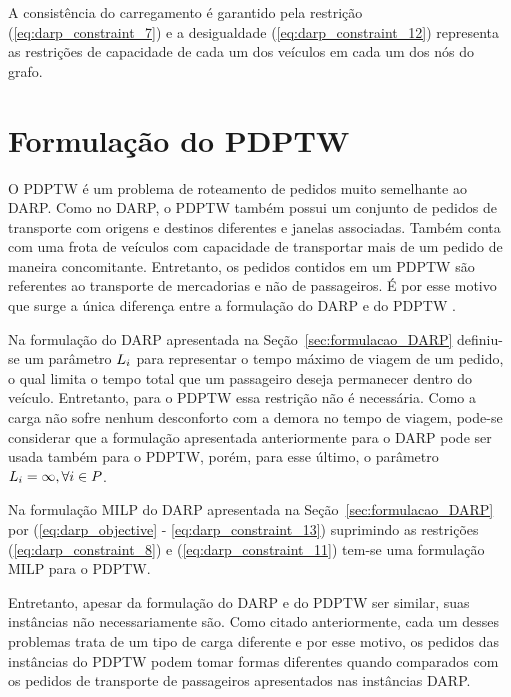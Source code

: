 A consistência do carregamento é garantido pela restrição 
(\ref{eq:darp_constraint_7}) e a desigualdade (\ref{eq:darp_constraint_12})
representa as restrições de capacidade de cada um dos veículos em cada um dos
nós do grafo.





\section{Formulação do PDPTW}\label{sec:formulacao_PDPTW}

O PDPTW é um problema de roteamento de pedidos muito semelhante ao DARP.
Como no DARP, o PDPTW também possui um conjunto de pedidos de transporte com
origens e destinos diferentes e janelas associadas.
Também conta com uma frota de veículos com capacidade de transportar mais de um
pedido de maneira concomitante.
Entretanto, os pedidos contidos em um PDPTW são referentes ao transporte de
mercadorias e não de passageiros.
É por esse motivo que surge a única diferença entre a formulação do DARP e do
PDPTW \cite{parragh_survey_2008}.

Na formulação do DARP apresentada na Seção~\ref{sec:formulacao_DARP} definiu-se
um parâmetro $L_i$ para representar o tempo máximo de viagem
de um pedido, o qual limita o tempo total que um passageiro deseja permanecer
dentro do veículo.
Entretanto, para o PDPTW essa restrição não é necessária. Como a carga não
sofre nenhum desconforto com a demora no tempo de viagem, pode-se considerar 
que a formulação apresentada anteriormente para o DARP pode ser usada também 
para o PDPTW, porém, para esse último, o parâmetro 
$L_i = \infty, \forall i \in P$.

Na formulação MILP do DARP apresentada na Seção~\ref{sec:formulacao_DARP} por
(\ref{eq:darp_objective} - \ref{eq:darp_constraint_13}) suprimindo as
restrições (\ref{eq:darp_constraint_8}) e (\ref{eq:darp_constraint_11}) 
tem-se uma formulação MILP para o PDPTW.

\iffalse
Entretanto, apesar da formulação do DARP e do PDPTW ser similar, suas
instâncias não necessariamente são.
Como citado anteriormente, cada um desses problemas trata de um tipo de carga
diferente e por esse motivo, os pedidos das instâncias do PDPTW podem tomar
formas diferentes quando comparados com os pedidos de transporte de passageiros
apresentados nas instâncias DARP.

